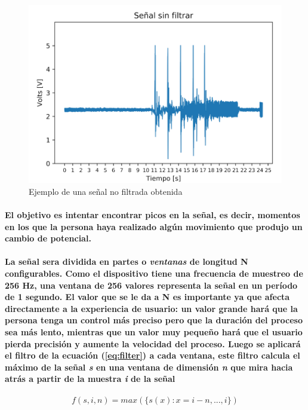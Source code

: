 \documentclass{article}
\begin{document}
\begin{figure}[ht]
    \centering
    \includegraphics[width=\textwidth]{no-filter.png}%
    \caption{Ejemplo de una señal no filtrada obtenida}
    \label{fig:no-filter}
\end{figure}

\paragraph{
El objetivo es intentar encontrar picos en la señal, es decir, momentos en los que la persona haya realizado algún movimiento que produjo un cambio de potencial.
}
\paragraph{
La señal sera dividida en partes o \textit{ventanas} de longitud N configurables. Como el dispositivo tiene una frecuencia de muestreo de 256 Hz, una ventana de 256 valores representa la señal en un período de 1 segundo. El valor que se le da a N es importante ya que afecta directamente a la experiencia de usuario: un valor grande hará que la persona tenga un control más preciso pero que la duración del proceso sea más lento, mientras que un valor muy pequeño hará que el usuario pierda precisión y aumente la velocidad del proceso. Luego se aplicará el filtro de la ecuación (\ref{eq:filter}) a cada ventana, este filtro calcula el máximo de la señal \textit{s} en una ventana de dimensión \textit{n}  que mira hacia atrás a partir de la muestra \textit{i} de la señal
}

\begin{equation}\label{eq:filter}
f(s, i, n) = max(\big\{ s(x) : x = i - n, ..., i\big\})
\end{equation}
\end{document}
